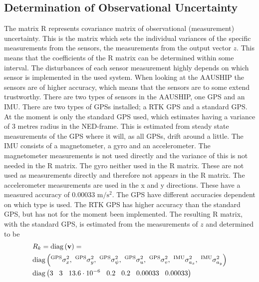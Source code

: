 \subsection{Determination of Observational Uncertainty}
The matrix R represents covariance matrix of observational (measurement) uncertainty. This is the matrix which sets the individual variances of the specific measurements from the sensors, the measurements from the output vector $z$. This means that the coefficients of the R matrix can be determined within some interval. The disturbances of each sensor measurement highly depends on which sensor is implemented in the used system. When looking at the AAUSHIP the sensors are of higher accuracy, which means that the sensors are to some extend trustworthy. There are two types of sensors in the AAUSHIP, one \ac{GPS} and an \ac{IMU}. There are two types of \ac{GPS}s installed; a \ac{RTK} \ac{GPS} and a standard \ac{GPS}. At the moment is only the standard \ac{GPS} used, which estimates having a variance of 3 metres radius in the \ac{NED}-frame. This is estimated from steady state measurements of the \ac{GPS} where it will, as all \ac{GPS}s, drift around a little. The \ac{IMU} consists of a magnetometer, a gyro and an accelerometer. The magnetometer measurements is not used directly and the variance of this is not needed in the R matrix. The gyro neither used in the R matrix. These are not used as measurements directly and therefore not appears in the R matrix. The accelerometer measurements are used in the x and y directions. These have a measured accuracy of 0.00033 $\text{m}/\text{s}^2$. The \ac{GPS} have different accuracies dependent on which type is used. The \ac{RTK} \ac{GPS} has higher accuracy than the standard \ac{GPS}, but has not for the moment been implemented. The resulting R matrix, with the standard \ac{GPS}, is estimated from the measurements of $z$ and determined to be
\begin{align}
&R_k = \diag{\mathbf{v}} =\\ \nonumber
&\diag{^\text{GPS}\sigma_{x}^2,\ ^\text{GPS}\sigma_{y}^2,\ ^\text{GPS}\sigma_{\psi}^2,\ ^\text{GPS}\sigma_{u}^2,\ ^\text{GPS}\sigma_{v}^2,\ ^\text{IMU}\sigma_{a_x}^2,\ ^\text{IMU}\sigma_{a_y}^2}\\ \nonumber
&\diag{3\hspace{3mm} 3\hspace{3mm} 13.6\cdot 10^{-6}\hspace{3mm} 0.2\hspace{3mm} 0.2\hspace{3mm} 0.00033\hspace{3mm} 0.00033}
\end{align}

